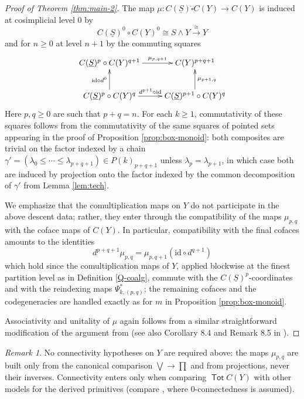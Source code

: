 \documentclass[12pt]{amsart}
\theoremstyle{definition}
\theoremstyle{remark}
\newtheorem{remark}[subsection]{Remark}
\newcommand{\Tot}{\operatorname{\mathsf{Tot}}}
\newcommand{\id}{\mathrm{id}}
\newcommand{\boxcirc}{\mathring{\square}}
\newcommand{\uS}{\underline{S}}
\begin{document}
\begin{proof}[Proof of Theorem \ref{thm:main-2}]
    The map $\mu \colon C(\uS)\boxcirc C(Y)\to C(Y)$ is induced at cosimplicial level $0$ by \[ C(\uS)^0\circ C(Y)^0\cong S\wedge Y\xrightarrow{\cong} Y\] and for $n\geq 0$ at level $n+1$ by the commuting squares \[\xymatrix{
        C(\uS)^{p}\circ C(Y)^{q+1} \ar[r]^-{\mu_{p,q+1}} 
        &
        C(Y)^{p+q+1}
        \\
        C(\uS)^{p} \circ C(Y)^{q} \ar[u]^-{\id \circ d^0} \ar[r]^-{d^{p+1} \circ \id}
        &
        C(\uS)^{p+1}\circ C(Y)^{q} \ar[u]_-{\mu_{p+1,q}}
    }\]
    Here $p,q\geq 0$ are such that $p+q=n$. For each $k\geq 1$, commutativity of these squares follows from the commutativity of the same squares of pointed sets appearing in the proof of Proposition \ref{prop:box-monoid}: both composites are trivial on the factor indexed by a chain $\gamma'=(\lambda_0\leq \cdots \leq \lambda_{p+q+1})\in P(k)_{p+q+1}$ unless $\lambda_p=\lambda_{p+1}$, in which case both are induced by projection onto the factor indexed by the common decomposition of $\gamma'$ from Lemma \ref{lem:tech}.

    We emphasize that the comultiplication maps on $Y$ do not participate in the above descent data; rather, they enter through the compatibility of the maps $\mu_{p,q}$ with the coface maps of $C(Y)$. In particular, compatibility with the final cofaces amounts to the identities \[ d^{p+q+1} \mu_{p,q}=\mu_{p,q+1} (\id \circ d^{q+1})\] which hold since the comultiplication maps of $Y$, applied blockwise at the finest partition level as in Definition \ref{Q-coalg}, commute with the $C(\uS)^p$-coordinates and with the reindexing maps $\Psi_{k,(p,q)}^*$; the remaining cofaces and the codegeneracies are handled exactly as for $m$ in Proposition \ref{prop:box-monoid}.
    
    Associativity and unitality of $\mu$ again follows from a similar straightforward modification of the  argument from \cite[Proposition 5.8]{Clark-1} (see also Corollary 8.4 and Remark 8.5 in  \cite{Clark-1}).
\end{proof}

\begin{remark}
    No connectivity hypotheses on $Y$ are required above: the maps $\mu_{p,q}$ are built only from the canonical comparison $\bigvee \to \prod$ and from projections, never their inverses. Connectivity enters only when comparing $\Tot C(Y)$ with other models for the derived primitives (compare \cite[Corollary 8.4]{Clark-1}, where $0$-connectedness is assumed).
\end{remark}
\end{document}
